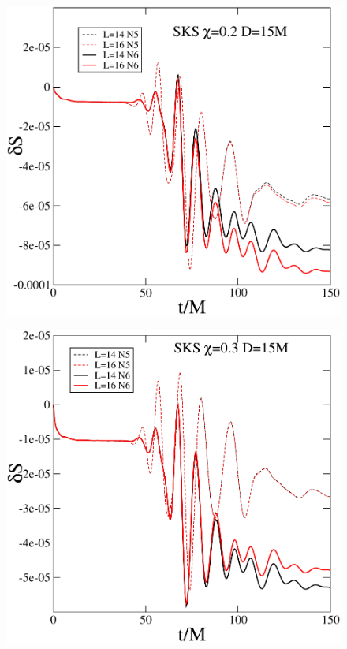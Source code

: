 \documentclass[aps,prd,amsmath,floatfix,twocolumn,superscriptaddress,nofootinbib,showpacs]{revtex4-1}
\theoremstyle{plain}
\theoremstyle{definition}
\begin{document}
\begin{figure}
  \includegraphics[width=0.99\columnwidth]{dS_SKS_S2}
\end{figure}

\begin{figure}
  \includegraphics[width=0.99\columnwidth]{dS_SKS_S3}
\end{figure}
\end{document}

